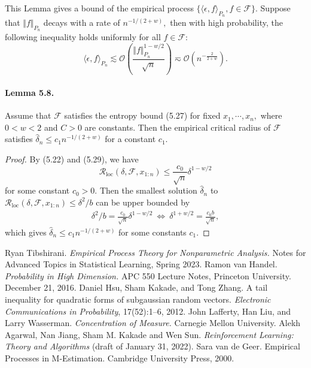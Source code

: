 \documentclass{article}
\begin{document}
This Lemma gives a bound of the empirical process $\{\langle\epsilon,f\rangle_{P_n},f\in\mathcal{F}\}.$ Suppose that $\Vert f\Vert_{P_n}$ decays with a rate of $n^{-1/(2+w)},$ then with high probability, the following inequality holds uniformly for all $f\in\mathcal{F}:$
\begin{equation*}
	\langle\epsilon,f\rangle_{P_n}\lesssim\mathcal{O}\left(\frac{\Vert f\Vert_{P_n}^{1-w/2}}{\sqrt{n}}\right)\eqsim\mathcal{O}\left(n^{-\frac{2}{2+w}}\right).\tag{5.33}
\end{equation*}

\paragraph{Lemma 5.8.} Assume that $\mathcal{F}$ satisfies the entropy bound (5.27) for fixed $x_1,\cdots,x_n,$ where $0<w<2$ and $C>0$ are constants. Then the empirical critical radius of $\mathcal{F}$ satisfies $\widehat{\delta}_n\leq c_1n^{-1/(2+w)}$ for a constant $c_1.$
\begin{proof}
By (5.22) and (5.29), we have
\begin{equation*}
	\mathcal{R}_{\mathrm{loc}}(\delta,\mathcal{F},x_{1:n}) \leq \frac{c_0}{\sqrt{n}}\delta^{1-w/2}\tag{5.34}
\end{equation*}
for some constant $c_0>0.$ Then the smallest solution $\widehat{\delta}_n$ to $\mathcal{R}_{\mathrm{loc}}(\delta,\mathcal{F},x_{1:n})\leq\delta^2/b$ can be upper bounded by
\begin{align*}
	\delta^2/b = \frac{c_0}{\sqrt{n}}\delta^{1-w/2}\ \Leftrightarrow\ \delta^{1+w/2} = \frac{c_0b}{\sqrt{n}},\tag{5.35}
\end{align*}
which gives $\widehat{\delta}_n\leq c_1n^{-1/(2+w)}$ for some constants $c_1.$
\end{proof} 


\begin{thebibliography}{100}
 Ryan Tibshirani. \textit{Empirical Process Theory for Nonparametric Analysis.} Notes for Advanced Topics in Statistical Learning, Spring 2023.
 Ramon van Handel. \textit{Probability in High Dimension.} APC 550 Lecture Notes, Princeton University. December 21, 2016.
 Daniel Hsu, Sham Kakade, and Tong Zhang. A tail inequality for quadratic forms of subgaussian random
vectors. \textit{Electronic Communications in Probability}, 17(52):1–6, 2012.
 John Lafferty, Han Liu, and Larry Wasserman. \textit{Concentration of Measure.} Carnegie Mellon University.
 Alekh Agarwal, Nan Jiang, Sham M. Kakade and Wen Sun. \textit{Reinforcement Learning: Theory and Algorithms} (draft of January 31, 2022).
 Sara van de Geer. Empirical Processes in M-Estimation. Cambridge University Press, 2000.
\end{thebibliography}
\end{document}
